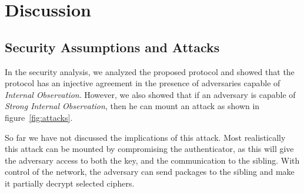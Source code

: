 \chapter{Discussion}\label{ch:discussion}

\section{Security Assumptions and Attacks} \label{sec:attacks}

In the security analysis, we analyzed the proposed protocol and showed that the protocol has an injective agreement in the presence of adversaries capable of \textit{Internal Observation}. However, we also showed that if an adversary is capable of \textit{Strong Internal Observation}, then he can mount an attack as shown in figure~\ref{fig:attacks}.

So far we have not discussed the implications of this attack. Most realistically this attack can be mounted by compromising the \gls{authenticator}, as this will give the adversary access to both the key, and the communication to the \gls{sibling}. With control of the network, the adversary can send packages to the \gls{sibling} and make it partially decrypt selected ciphers.

